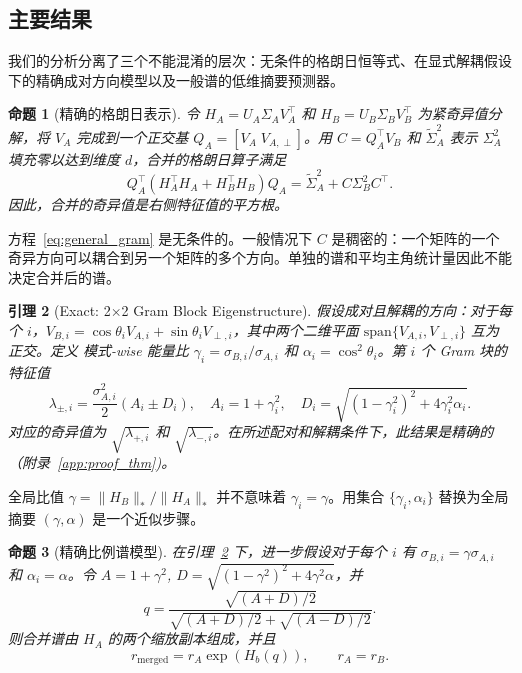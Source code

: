 \documentclass{article}
\newtheorem{lemma}{引理}
\newtheorem{proposition}[lemma]{命题}
\begin{document}
\subsection{主要结果}
\label{sec:theorem}

我们的分析分离了三个不能混淆的层次：无条件的格朗日恒等式、在显式解耦假设下的精确成对方向模型以及一般谱的低维摘要预测器。

\begin{proposition}[精确的格朗日表示]
\label{prop:gram_general}
令 $H_A=U_A\Sigma_A V_A^\top$ 和
$H_B=U_B\Sigma_B V_B^\top$ 为紧奇异值分解，将 $V_A$ 完成到一个正交基 $Q_A=[V_A\;V_{A,\perp}]$。用
$C=Q_A^\top V_B$ 和 $\widetilde\Sigma_A^2$ 表示 $\Sigma_A^2$ 填充零以达到维度 $d$，合并的格朗日算子满足
\begin{equation}
 Q_A^\top(H_A^\top H_A+H_B^\top H_B)Q_A
 =\widetilde\Sigma_A^2+C\Sigma_B^2C^\top.
 \label{eq:general_gram}
\end{equation}
因此，合并的奇异值是右侧特征值的平方根。
\end{proposition}

方程~\eqref{eq:general_gram} 是无条件的。一般情况下 $C$ 是稠密的：一个矩阵的一个奇异方向可以耦合到另一个矩阵的多个方向。单独的谱和平均主角统计量因此不能决定合并后的谱。
\begin{lemma}[Exact: 2$\times$2 Gram Block Eigenstructure]
\label{lem:gram}
假设成对且解耦的方向：对于每个 $i$，$V_{B,i}=\cos\theta_i V_{A,i}+\sin\theta_i V_{\perp,i}$，其中两个二维平面 $\mathrm{span}\{V_{A,i},V_{\perp,i}\}$ 互为正交。定义 \emph{模式-wise} 能量比 $\gamma_i=\sigma_{B,i}/\sigma_{A,i}$ 和 $\alpha_i=\cos^2\theta_i$。第 $i$ 个 Gram 块的特征值
\begin{equation}
 \lambda_{\pm,i}=\frac{\sigma_{A,i}^2}{2}
 \left(A_i\pm D_i\right),\quad
 A_i=1+\gamma_i^2,\quad
 D_i=\sqrt{(1-\gamma_i^2)^2+4\gamma_i^2\alpha_i}.
  \label{eq:discriminant}
\end{equation}
对应的奇异值为 $\sqrt{\lambda_{+,i}}$ 和 $\sqrt{\lambda_{-,i}}$。在所述配对和解耦条件下，此结果是精确的（附录~\ref{app:proof_thm})。
\end{lemma}

全局比值 $\gamma=\|H_B\|_*/\|H_A\|_*$ 并不意味着 $\gamma_i=\gamma$。用集合 $\{\gamma_i,\alpha_i\}$ 替换为全局摘要 $(\gamma,\alpha)$ 是一个近似步骤。

\begin{proposition}[精确比例谱模型]
\label{prop:proportional}
在引理~\ref{lem:gram} 下，进一步假设对于每个 $i$ 有 $\sigma_{B,i}=\gamma\sigma_{A,i}$ 和 $\alpha_i=\alpha$。令 $A=1+\gamma^2$, $D=\sqrt{(1-\gamma^2)^2+4\gamma^2\alpha}$，并
\begin{equation}
 q = \frac{\sqrt{(A+D)/2}}
 {\sqrt{(A+D)/2}+\sqrt{(A-D)/2}}.
  \label{eq:rstar}
\end{equation}
则合并谱由 $H_A$ 的两个缩放副本组成，并且
\begin{equation}
 r_{\mathrm{merged}}=r_A\exp(H_b(q)),\qquad r_A=r_B.
 \label{eq:proportional_exact}
\end{equation}
\end{proposition}
\end{document}
